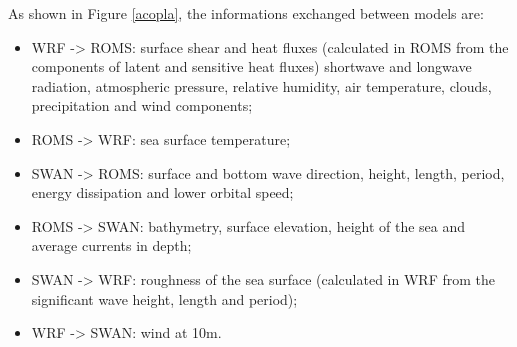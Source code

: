 \noindent As shown in Figure \textcolor{bleu_cite}{\ref{acopla}}, the informations exchanged between models are:
\bigskip

\begin{itemize}
\item WRF -> ROMS: surface shear and heat fluxes (calculated in ROMS from the components of latent and sensitive heat fluxes) shortwave and longwave radiation, atmospheric pressure, relative humidity, air temperature, clouds, precipitation and wind components;
\item ROMS -> WRF: sea surface temperature;
\item SWAN -> ROMS: surface and bottom wave direction, height, length, period, energy dissipation and lower orbital speed;
\item ROMS -> SWAN: bathymetry, surface elevation, height of the sea and average currents in depth;
\item SWAN -> WRF: roughness of the sea surface (calculated in WRF from the significant wave height, length and period);
\item WRF -> SWAN: wind at 10m.
\end{itemize}
\bigskip

